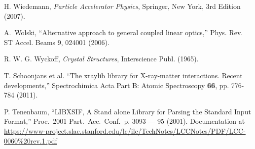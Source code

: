 \begin{thebibliography}{XXXXXXX99}
H. Wiedemann, {\em Particle Accelerator Physics}, Springer, New York, 3rd Edition (2007). 

A.~Wolski,  ``Alternative approach to general coupled linear optics,''
Phys. Rev. ST Accel. Beams 9, 024001 (2006).

R. W. G. Wyckoff, {\em Crystal Structures}, Interscience Publ. (1965).

T. Schoonjans et al. ``The xraylib library for X-ray-matter
interactions. Recent developments,'' Spectrochimica Acta Part B: Atomic
Spectroscopy {\bf 66}, pp. 776-784 (2011).

P. Tenenbaum, ``LIBXSIF, A Stand alone Library for Parsing the Standard 
Input Format,'' Proc.\ 2001 Part.\ Acc.\ Conf.\ p. 3093 --- 95 (2001).
Documentation at
\hfill\break
\hspace*{0.3in} \url{https://www-project.slac.stanford.edu/lc/ilc/TechNotes/LCCNotes/PDF/LCC-0060%20rev.1.pdf}

\end{thebibliography}
